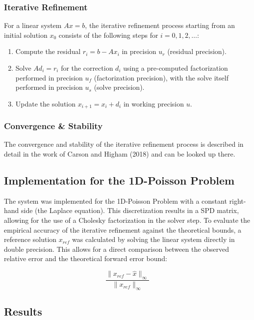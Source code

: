 \documentclass[a4paper,11pt]{article}
\begin{document}
\subsubsection{Iterative Refinement}

For a linear system $Ax = b$, the iterative refinement process starting from an initial solution $x_0$ consists of the following steps for $i = 0, 1, 2, \dots$:
\begin{enumerate}
  \item Compute the residual $r_i = b - Ax_i$ in precision $u_r$ (residual precision).
  \item Solve $Ad_i = r_i$ for the correction $d_i$ using a pre-computed factorization performed in precision $u_f$ (factorization precision), with the solve itself performed in precision $u_s$ (solve precision).
  \item Update the solution $x_{i+1} = x_i + d_i$ in working precision $u$.
\end{enumerate}

\subsubsection{Convergence \& Stability}
The convergence and stability of the iterative refinement process is described in detail in the work of Carson and Higham (2018)
and can be looked up there.

\subsection{Implementation for the 1D-Poisson Problem}

The system was implemented for the 1D-Poisson Problem with a constant right-hand side (the Laplace equation).
This discretization results in a SPD matrix,
allowing for the use of a Cholesky factorization in the solver step.
To evaluate the empirical accuracy of the iterative refinement against the theoretical bounds,
a reference solution $x_{ref}$ was calculated by solving the linear system directly
in double precision. This allows for a direct comparison between the
observed relative error and the theoretical forward error bound:

$$\frac{\|x_{ref} - \hat{x}\|_\infty}{\|x_{ref}\|_\infty}$$

\subsection{Results}
\end{document}
